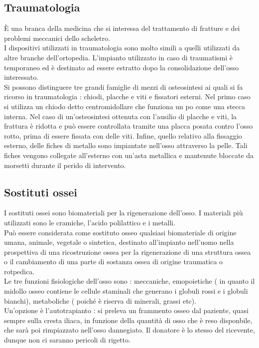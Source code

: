 \documentclass[a4paper]{article}
\begin{document}
\subsection{Traumatologia}
È una branca della medicina che si interessa del trattamento di fratture e dei problemi meccanici dello
scheletro. \\
I dispositivi utilizzati in traumatologia sono molto simili a quelli utilizzati da altre branche dell’ortopedia.
L’impianto utilizzato in caso di traumatismi è temporaneo ed è destinato ad essere estratto dopo la
consolidazione dell’osso interessato. \\
Si possono
distinguere tre grandi famiglie di mezzi di osteosintesi ai quali si fa ricorso in traumatologia : chiodi, placche
e viti e fissatori esterni. Nel primo caso si utilizza un chiodo detto centromidollare che funziona un po come una stecca interna.
Nel caso di un’osteosintesi ottenuta con l’ausilio di placche e viti, la frattura è ridotta e può essere
controllata tramite una placca posata contro l’osso rotto, prima di essere fissata con delle viti. Infine, quello
relativo alla fissaggio esterno, delle fiches di metallo sono impiantate nell’osso attraverso la pelle. Tali fiches
vengono collegate all’esterno con un’asta metallica e mantenute bloccate da morsetti durante il perido di
intervento. 

\subsection{Sostituti ossei}
I sostituti ossei sono biomateriali per la rigenerazione dell’osso. I materiali più utilizzati sono le cramiche,
l’acido polilattico e i metalli. \\
Può essere considerata come sostituto osseo qualsiasi biomateriale di origine umana, animale, vegetale o
sintetica, destinato all’impianto nell’uomo nella prospettiva di una ricostruzione ossea per la rigenerazione di
una struttura ossea o il cambiamento di una parte di sostanza ossea di origine traumatica o rotpedica. \\
Le tre funzioni fisiologiche dell’osso sono : meccaniche, emopoietiche ( in quanto il midollo osseo contiene le
cellule staminali che generano i globuli rossi e i globuli bianchi), metaboliche ( poiché è riserva di minerali,
grassi etc). \\
Un’opzione è l’autotrapianto : si preleva un frammento osseo dal paziente, quasi sempre
sulla cresta iliaca, in funzione della quantità di osso che è reso disponbile, che sarà poi rimpiazzato nell’osso
dannegiato. Il donatore è lo stesso del ricevente, dunque non ci saranno pericoli di rigetto. \\
\end{document}
